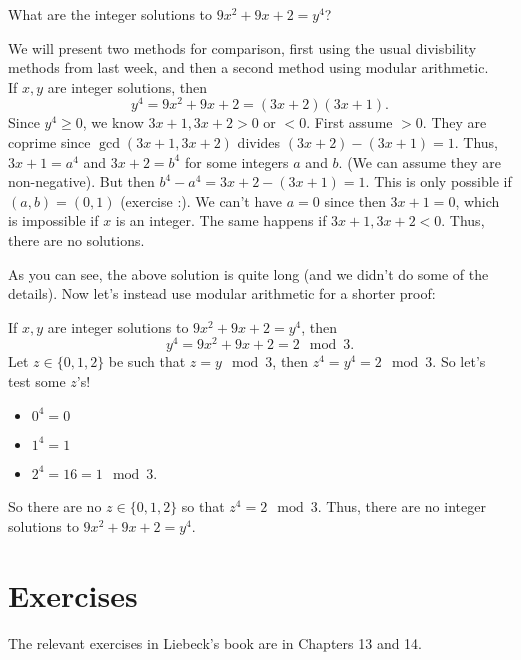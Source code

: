 \documentclass[11pt,dvipsnames]{book}
\numberwithin{figure}{section} %
\numberwithin{table}{section} %
\begin{document}
\begin{example}
What are the integer solutions to $9x^{2}+9x+2=y^{4}$?

 We will present two methods for comparison, first using the usual divisbility methods from last week, and then a second method using modular arithmetic.\\

  If $x,y$ are integer solutions, then
\[
y^{4}=9x^{2}+9x+2 =(3x+2)(3x+1).
\]
 Since $y^{4}\geq 0$, we know $3x+1,3x+2> 0$ or $<0$.  First assume $>0$.   They are coprime since $\gcd(3x+1,3x+2)$ divides $ (3x+2)-(3x+1)=1$.   Thus, $3x+1=a^{4}$ and $3x+2=b^{4}$ for some integers $a$ and $b$.   (We can assume they are non-negative). But then $b^{4}-a^{4} =3x+2-(3x+1) =1$.   This is only possible if $(a,b)=(0,1)$  (exercise :). We can't have $a=0$ since then $3x+1=0$,  which is impossible if $x$ is an integer. The same happens if $3x+1,3x+2<0$.  Thus, there are no solutions.

\vspace{10pt}

As you can see, the above solution is quite long (and we didn't do some of the details). Now let's instead use modular arithmetic for a shorter proof:

 \vspace{10pt}

 If $x,y$ are integer solutions to $9x^{2}+9x+2=y^{4}$, then
\[
y^{4}=9x^{2}+9x+2
 = 2\mod 3.
\]
Let $z\in \{0,1,2\}$ be such that $z = y\mod 3$, then   $z^{4} = y^{4} = 2\mod 3$.
 So let's test some $z$'s!
\begin{itemize}
\item $0^{4}=0$
\item $1^{4}=1$
\item $2^{4}=16 = 1 \mod 3$.
\end{itemize}
So there are no $z\in \{0,1,2\}$ so that $z^{4} = 2 \mod 3$.  Thus, there are no integer solutions to $9x^{2}+9x+2=y^{4}$.

\end{example}

\section{Exercises}

The relevant exercises in Liebeck's book are in Chapters 13 and 14.
\end{document}
